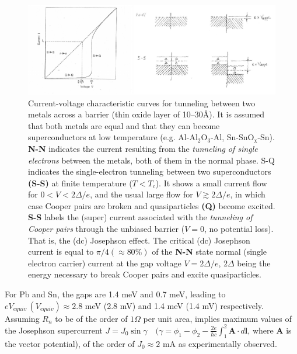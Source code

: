   \begin{figure}
  	\centerline{\includegraphics[width=15cm]{C6/figs_C6/fig4_6_1}}
  	\caption{Current-voltage characteristic curves for tunneling between two metals across a barrier (thin oxide layer of 10--30\AA). It is assumed that both metals are  equal and that they can become superconductors at low temperature (e.g. Al-Al$_2$O$_3$-Al, Sn-SnO$_\text{x}$-Sn). \textbf{N-N} indicates the  current resulting from the \textit{tunneling of single electrons} between the metals, both of them in the normal phase. S-Q indicates the single-electron tunneling between two superconductors \textbf{(S-S)} at finite temperature ($T<T_c$). It shows a small current flow for $0<V<2\Delta/e$, and the usual large flow for $V\gtrsim2\Delta/e$, in which case Cooper pairs are broken and quasiparticles \textbf{(Q)} become excited. \textbf{S-S} labels the (super) current associated with the \textit{tunneling of Cooper pairs} through the unbiased barrier ($V=0$, no potential loss). That is, the (dc) Josephson effect. The critical (dc) Josephson current  is equal to $\pi/4(\approx80\%)$ of the \textbf{N-N} state normal (single electron carrier) current at the gap voltage $V=2\Delta/e$, $2\Delta$ being the energy necessary to break Cooper pairs and excite quasiparticles.}\label{fig4.6.1}
  \end{figure}
  
  For Pb and Sn, the gaps are 1.4 meV and 0.7 meV, leading to $e V_{equiv} \,(V_{equiv})\approx 2.8$ meV (2.8 mV) and 1.4 meV (1.4 mV) respectively. Assuming $R_n$ to be of the order of $1\Omega$ per unit area, implies maximum values of the Josephson supercurrent $J=J_0\sin\gamma\quad(\gamma=\phi_1-\phi_2-\frac{2e}{\hbar c}\int^2_1\mathbf A\cdot d\mathbf l$, where $\mathbf A$ is the vector potential), of the order of $J_0\approx 2$ mA as experimentally observed.
 
